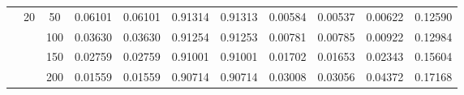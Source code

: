\documentclass[11pt]{article}
\begin{document}
\begin{center}
\begin{longtable}{|c|c|c|c|c|c|c|c|c|c|c|}
		& \multirow{4}{*}{20} &50  & 0.06101 & 0.06101 & 0.91314 & 0.91313 & 0.00584 & 0.00537 & 0.00622 & 0.12590 \\  \cline{3-11} 
		&                     &100 & 0.03630 & 0.03630 & 0.91254 & 0.91253 & 0.00781 & 0.00785 & 0.00922 & 0.12984 \\   \cline{3-11} 
		&                     &150 & 0.02759 & 0.02759 & 0.91001 & 0.91001 & 0.01702 & 0.01653 & 0.02343 & 0.15604 \\   \cline{3-11} 
		&                     &200 & 0.01559 & 0.01559 & 0.90714 & 0.90714 & 0.03008 & 0.03056 & 0.04372 & 0.17168 \\   \hline
	\end{longtable}
\end{center}



%
\end{document}

